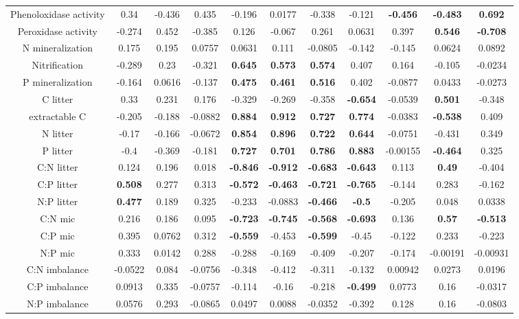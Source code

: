 \documentclass[authoryear,preprint,review,12pt]{elsarticle}
\begin{document}
\begin{table}[h!]
\begin{center}
{\begin{tabular}{ccccccccccc}
  Phenoloxidase activity & 0.34 & -0.436 & 0.435 & -0.196 & 0.0177 & -0.338 & -0.121 & \textbf{ -0.456 } & \textbf{ -0.483 } & \textbf{ 0.692 } \\ 
  Peroxidase activity & -0.274 & 0.452 & -0.385 & 0.126 & -0.067 & 0.261 & 0.0631 & 0.397 & \textbf{ 0.546 } & \textbf{ -0.708 } \\ 
  N mineralization & 0.175 & 0.195 & 0.0757 & 0.0631 & 0.111 & -0.0805 & -0.142 & -0.145 & 0.0624 & 0.0892 \\ 
  Nitrification & -0.289 & 0.23 & -0.321 & \textbf{ 0.645 } & \textbf{ 0.573 } & \textbf{ 0.574 } & 0.407 & 0.164 & -0.105 & -0.0234 \\ 
  P mineralization & -0.164 & 0.0616 & -0.137 & \textbf{ 0.475 } & \textbf{ 0.461 } & \textbf{ 0.516 } & 0.402 & -0.0877 & 0.0433 & -0.0273 \\ 
  C litter & 0.33 & 0.231 & 0.176 & -0.329 & -0.269 & -0.358 & \textbf{ -0.654 } & -0.0539 & \textbf{ 0.501 } & -0.348 \\ 
  extractable C & -0.205 & -0.188 & -0.0882 & \textbf{ 0.884 } & \textbf{ 0.912 } & \textbf{ 0.727 } & \textbf{ 0.774 } & -0.0383 & \textbf{ -0.538 } & 0.409 \\ 
  N litter & -0.17 & -0.166 & -0.0672 & \textbf{ 0.854 } & \textbf{ 0.896 } & \textbf{ 0.722 } & \textbf{ 0.644 } & -0.0751 & -0.431 & 0.349 \\ 
  P litter & -0.4 & -0.369 & -0.181 & \textbf{ 0.727 } & \textbf{ 0.701 } & \textbf{ 0.786 } & \textbf{ 0.883 } & -0.00155 & \textbf{ -0.464 } & 0.325 \\ 
  C:N litter & 0.124 & 0.196 & 0.018 & \textbf{ -0.846 } & \textbf{ -0.912 } & \textbf{ -0.683 } & \textbf{ -0.643 } & 0.113 & \textbf{ 0.49 } & -0.404 \\ 
  C:P litter & \textbf{ 0.508 } & 0.277 & 0.313 & \textbf{ -0.572 } & \textbf{ -0.463 } & \textbf{ -0.721 } & \textbf{ -0.765 } & -0.144 & 0.283 & -0.162 \\ 
  N:P litter & \textbf{ 0.477 } & 0.189 & 0.325 & -0.233 & -0.0883 & \textbf{ -0.466 } & \textbf{ -0.5 } & -0.205 & 0.048 & 0.0338 \\ 
  C:N mic & 0.216 & 0.186 & 0.095 & \textbf{ -0.723 } & \textbf{ -0.745 } & \textbf{ -0.568 } & \textbf{ -0.693 } & 0.136 & \textbf{ 0.57 } & \textbf{ -0.513 } \\ 
  C:P mic & 0.395 & 0.0762 & 0.312 & \textbf{ -0.559 } & -0.453 & \textbf{ -0.599 } & -0.45 & -0.122 & 0.233 & -0.223 \\ 
  N:P mic & 0.333 & 0.0142 & 0.288 & -0.288 & -0.169 & -0.409 & -0.207 & -0.174 & -0.00191 & -0.00931 \\ 
  C:N imbalance & -0.0522 & 0.084 & -0.0756 & -0.348 & -0.412 & -0.311 & -0.132 & 0.00942 & 0.0273 & 0.0196 \\ 
  C:P imbalance & 0.0913 & 0.335 & -0.0757 & -0.114 & -0.16 & -0.218 & \textbf{ -0.499 } & 0.0773 & 0.16 & -0.0317 \\ 
  N:P imbalance & 0.0576 & 0.293 & -0.0865 & 0.0497 & 0.0088 & -0.0352 & -0.392 & 0.128 & 0.16 & -0.0803 \\ 
   \hline
\end{tabular}
}
\end{center}
\end{table}
\end{document}
